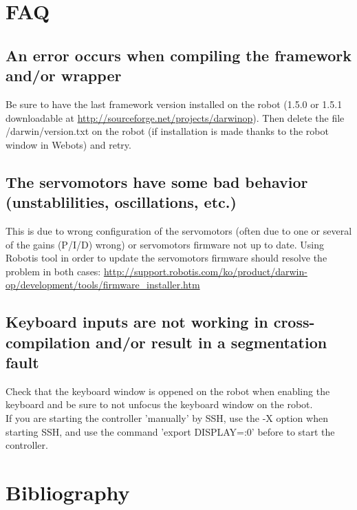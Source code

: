 \documentclass[a4paper, 12pt]{article}  		%
\begin{document}
\newpage
\section{FAQ}

\subsection*{An error occurs when compiling the framework and/or wrapper}
Be sure to have the last framework version installed on the robot (1.5.0 or 1.5.1 downloadable at \url{http://sourceforge.net/projects/darwinop}). Then delete the file /darwin/version.txt on the robot (if installation is made thanks to the robot window in Webots) and retry.\\

\subsection*{The servomotors have some bad behavior (unstablilities, oscillations, etc.)}
This is due to wrong configuration of the servomotors (often due to one or several of the gains (P/I/D) wrong) or servomotors firmware not up to date. 
Using Robotis tool in order to update the servomotors firmware should resolve the problem in both cases: \url{http://support.robotis.com/ko/product/darwin-op/development/tools/firmware_installer.htm}\\

\subsection*{Keyboard inputs are not working in cross-compilation and/or result in a segmentation fault}

Check that the keyboard window is oppened on the robot when enabling the keyboard and be sure to not unfocus the keyboard window on the robot.\\

If you are starting the controller 'manually' by SSH, use the -X option when starting SSH, and use the command 'export DISPLAY=:0' before to start the controller.\\


\newpage
\section{Bibliography}
\end{document}
